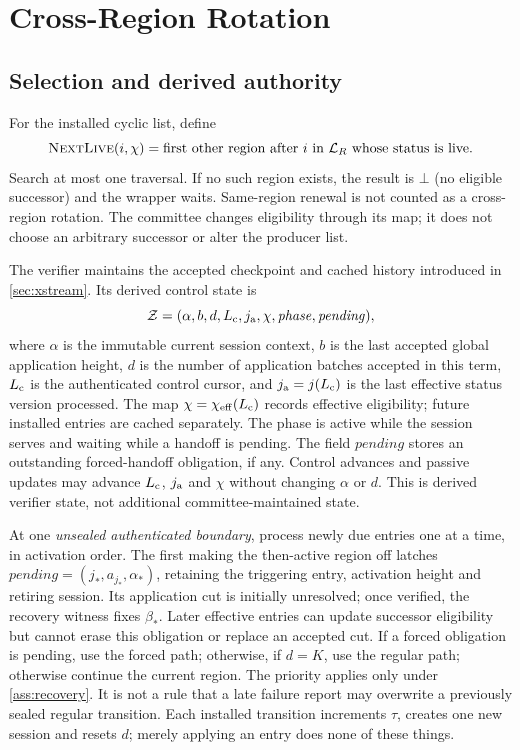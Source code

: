 \documentclass[11pt,a4paper,onecolumn]{article}
\newcommand{\Proc}[1]{\textnormal{\textsc{#1}}}
\begin{document}
\section{Cross-Region Rotation}\label{sec:rotation}
\subsection{Selection and derived authority}
For the installed cyclic list, define
\[
 \Proc{NextLive}(i,\chi)=\text{first other region after $i$ in
 $\mathcal L_R$ whose status is live}.
\]
Search at most one traversal. If no such region exists, the result is
$\bot$ (no eligible successor) and the wrapper waits. Same-region renewal is not counted
as a cross-region rotation. The committee changes eligibility through its
map; it does not choose an arbitrary successor or alter the producer list.

The verifier maintains the accepted checkpoint and cached history introduced
in \cref{sec:xstream}. Its derived control state is
\[
 \mathcal Z=(\alpha,b,d,L_{\rm c},j_{\rm a},\chi,\mathit{phase},\mathit{pending}),
\]
where $\alpha$ is the immutable current session context, $b$ is the last
accepted global application height, $d$ is the number of application batches
accepted in this term, $L_{\rm c}$ is the authenticated control cursor,
and $j_{\rm a}=j(L_{\rm c})$ is the last effective status version processed.
The map $\chi=\chi_{\rm eff}(L_{\rm c})$ records effective eligibility;
future installed entries are cached separately. The phase is active while the
session serves and waiting while a handoff is pending. The field
$\mathit{pending}$ stores an outstanding forced-handoff obligation, if any.
Control advances and passive updates may advance $L_{\rm c}$, $j_{\rm a}$ and
$\chi$ without changing $\alpha$ or $d$. This is derived verifier state,
not additional committee-maintained state.

At one \emph{unsealed authenticated boundary}, process newly due entries
one at a time, in activation order. The first making the then-active
region off latches
$\mathit{pending}=(j_*,a_{j_*},\alpha_*)$, retaining the triggering entry,
activation height and retiring session. Its application cut is initially
unresolved; once verified, the recovery witness fixes $\beta_*$.
Later effective entries can update successor eligibility but cannot erase
this obligation or replace an accepted cut. If a forced
obligation is pending, use the forced path; otherwise, if $d=K$, use the
regular path; otherwise continue the current region.
The priority applies only under \cref{ass:recovery}. It is not a rule that a
late failure report may overwrite a previously sealed regular transition.
Each installed transition increments $\tau$, creates one new session and
resets $d$; merely applying an entry does none of these things.
\end{document}
